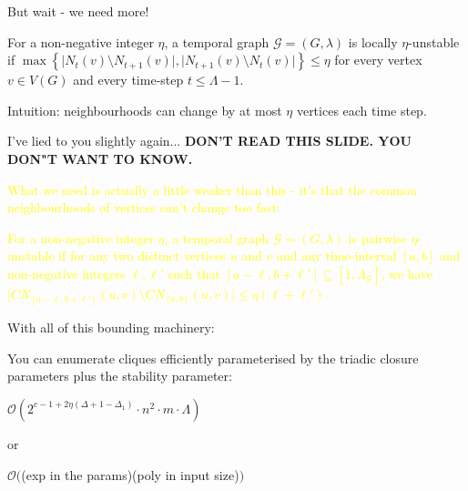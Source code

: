 \documentclass[10pt, compress]{beamer}
\newcommand{\card}[1]{\ensuremath{{\vert {#1} \vert }}}
\newcommand{\lt}{\ensuremath{\Lambda}} %
\newcommand{\pone}{\ensuremath{\Delta_1}} %
\newcommand{\pcq}{\ensuremath{\Delta}} %
\newcommand{\weaknbdboundplus}{\ensuremath{c- 1 + 2\eta(\pcq + 1 - \pone)}}
\newcommand{\ca}[1]{\ensuremath{\mathcal{#1} }}
\newcommand{\set}[1]{\ensuremath{\left\{ {#1} \right\}}}
\begin{document}
\begin{frame}{But wait - we need more!}
\begin{definition}\label{def:eta-unstable}
    For a non-negative integer $\eta$, a temporal graph $\ca{G} = (G, \lambda)$ is locally $\eta$-unstable if $\max\set{\card{N_t(v) \setminus N_{t + 1}(v)}, \card{N_{t + 1}(v) \setminus N_{t}(v)}} \leq \eta$ for every vertex $v \in V(G)$ and every time-step $t \leq \lt - 1$. 
\end{definition}
\bigskip

 Intuition: neighbourhoods can change by at most $\eta$ vertices each time step. 

\end{frame}

\begin{frame}{I've lied to you slightly again...}
\textbf{DON'T READ THIS SLIDE. YOU DON"T WANT TO KNOW.}





\textcolor{yellow}{What we need is actually a little weaker than this - it's that the common neighbourhoods of vertices can't change too fast:}

\begin{definition}\label{def:pairwise-eta-unstable}
    \textcolor{yellow}{For a non-negative integer $\eta$, a temporal graph $\ca{G} = (G, \lambda)$ is pairwise  $\eta$-unstable if for any two distinct vertices $u$ and $v$ and any time-interval $[a, b]$  and non-negative integers $\ell, \ell'$ such that $[a - \ell, b + \ell'] \subseteq [1, \lt_{\ca{G}}]$, we have $\card{CN_{[a - \ell, b + \ell']}(u, v) \setminus CN_{[a, b]}(u, v)} \leq \eta (\ell + \ell')$.   }
\end{definition} 


\end{frame}

\begin{frame}
With all of this bounding machinery:

\bigskip

You can enumerate cliques efficiently parameterised by the triadic closure parameters plus the stability parameter:

\bigskip
{\huge $\mathcal{O}(2^{\weaknbdboundplus} \cdot n^2 \cdot m \cdot \lt)$} 

\bigskip

or

\bigskip

{\Large$\mathcal{O}($(exp in the params)(poly in input size)$)$}

\end{frame}
\end{document}
